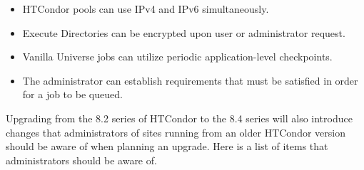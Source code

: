\begin{itemize}
\begin{itemize}
  \end{itemize}

\item HTCondor pools can use IPv4 and IPv6 simultaneously.

\item Execute Directories can be encrypted upon user or administrator request.

\item Vanilla Universe jobs can utilize periodic application-level checkpoints.

\item The administrator can establish requirements that must be satisfied in
order for a job to be queued.

\end{itemize}

Upgrading from the 8.2 series of HTCondor to the 8.4 series will
also introduce changes that administrators of sites running from an older
HTCondor version should be aware of when planning an upgrade.
Here is a list of items that administrators should be aware of.

